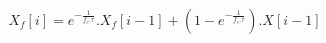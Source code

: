 \[
X_f[i] = e^{-\frac{1}{f_e.\tau}}.X_f[i-1] +
         \left( 1 - e^{-\frac{1}{f_e.\tau}} \right). X[i-1]
\]

